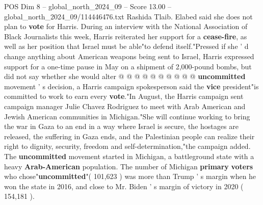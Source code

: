 \begin{textsample}{POS Dim 8 – global\_north\_2024\_09 – Score 13.00 – global\_north\_2024\_09/114446476.txt}
Rashida Tlaib.
Elabed said she does not plan to \textbf{vote} for Harris.
During an interview with the National Association of Black Journalists this week, Harris reiterated her support for a \textbf{cease-fire}, as well as her position that Israel must be able"to defend itself."Pressed if she ' d change anything about American weapons being sent to Israel, Harris expressed support for a one-time pause in May on a shipment of 2,000-pound bombs, but did not say whether she would alter @ @ @ @ @ @ @ @ @ @ \textbf{uncommitted} movement ' s decision, a Harris campaign spokesperson said the \textbf{vice} president"is committed to work to earn every \textbf{vote}."In August, the Harris campaign sent campaign manager Julie Chavez Rodriguez to meet with Arab American and Jewish American communities in Michigan."She will continue working to bring the war in Gaza to an end in a way where Israel is secure, the hostages are released, the suffering in Gaza ends, and the Palestinian people can realize their right to dignity, security, freedom and self-determination,"the campaign added.
The \textbf{uncommitted} movement started in Michigan, a battleground state with a heavy \textbf{Arab-American} population.
The number of Michigan \textbf{primary} \textbf{voters} who chose"\textbf{uncommitted}"( 101,623 ) was more than Trump ' s margin when he won the state in 2016, and close to Mr.
Biden ' s margin of victory in 2020 ( 154,181 ).

\end{textsample}
